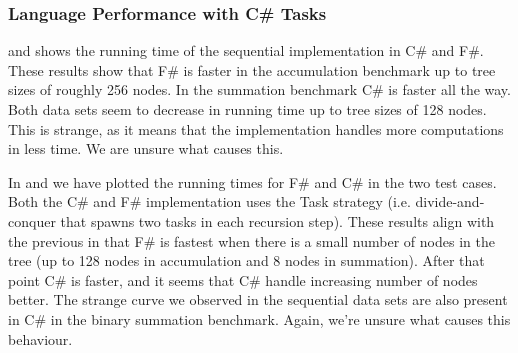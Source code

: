 \subsubsection{Language Performance with C\# Tasks}
 and  shows the running time of the sequential implementation in C\# and F\#. These results show that F\# is faster in the accumulation benchmark up to tree sizes of roughly 256 nodes. In the summation benchmark C\# is faster all the way. Both data sets seem to decrease in running time up to tree sizes of 128 nodes. This is strange, as it means that the implementation handles more computations in less time. We are unsure what causes this.


In  and  we have plotted the running times for F\# and C\# in the two test cases. Both the C\# and F\# implementation uses the Task strategy (i.e. divide-and-conquer that spawns two tasks in each recursion step). These results align with the previous in that F\# is fastest when there is a small number of nodes in the tree (up to 128 nodes in accumulation and 8 nodes in summation). After that point C\# is faster, and it seems that C\# handle increasing number of nodes better. The strange curve we observed in the sequential data sets are also present in C\# in the binary summation benchmark. Again, we're unsure what causes this behaviour.

